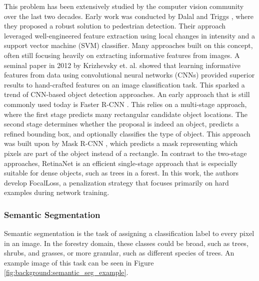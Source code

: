 This problem has been extensively studied by the computer vision community over the last two decades. Early work was conducted by Dalal and Triggs \cite{Dalal2005humanDetection}, where they proposed a robust solution to pedestrian detection. Their approach leveraged well-engineered feature extraction using local changes in intensity and a support vector machine (SVM) classifier. Many approaches built on this concept, often still focusing heavily on extracting informative features from images. A seminal paper in 2012 by Krizhevsky et. al. \cite{NIPS2012_c399862d} showed that learning informative features from data using convolutional neural networks (CNNs) provided superior results to hand-crafted features on an image classification task. This sparked a trend of CNN-based object detection approaches. An early approach that is still commonly used today is Faster R-CNN \cite{Ren2017FasterNetworks}. This relies on a multi-stage approach, where the first stage predicts many rectangular candidate object locations. The second stage determines whether the proposal is indeed an object, predicts a refined bounding box, and optionally classifies the type of object. This approach was built upon by Mask R-CNN \cite{He2017MaskR-CNN}, which predicts a mask representing which pixels are part of the object instead of a rectangle. In contrast to the two-stage approaches, RetinaNet \cite{Lin2020FocalDetection} is an efficient single-stage approach that is especially suitable for dense objects, such as trees in a forest. In this work, the authors develop FocalLoss, a penalization strategy that focuses primarily on hard examples during network training.

\subsubsection{Semantic Segmentation}
Semantic segmentation is the task of assigning a classification label to every pixel in an image. In the forestry domain, these classes could be broad, such as trees, shrubs, and grasses, or more granular, such as different species of trees. An example image of this task can be seen in Figure \ref{fig:background:semantic_seg_example}.

